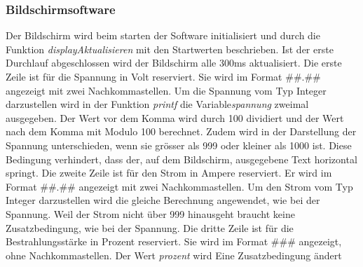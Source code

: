 \subsubsection{Bildschirmsoftware}
Der Bildschirm wird beim starten der Software initialisiert und durch die Funktion \textit{displayAktualisieren} mit den Startwerten beschrieben. Ist der erste Durchlauf abgeschlossen wird der Bildschirm alle 300ms aktualisiert.
\newline
Die erste Zeile ist für die Spannung in Volt reserviert. Sie wird im Format ##.## angezeigt mit zwei Nachkommastellen. Um die Spannung vom Typ Integer darzustellen wird in der Funktion \textit{printf} die Variable\textit{spannung} zweimal ausgegeben. Der Wert vor dem Komma wird durch 100 dividiert und der Wert nach dem Komma mit Modulo 100 berechnet. Zudem wird in der Darstellung der Spannung unterschieden, wenn sie grösser als 999 oder kleiner als 1000 ist. Diese Bedingung verhindert, dass der, auf dem Bildschirm, ausgegebene Text horizontal springt. 
\newline
Die zweite Zeile ist für den Strom in Ampere reserviert. Er wird im Format ##.## angezeigt mit zwei Nachkommastellen. Um den Strom vom Typ Integer darzustellen wird die gleiche Berechnung angewendet, wie bei der Spannung. Weil der Strom nicht über 999 hinausgeht braucht keine Zusatzbedingung, wie bei der Spannung.
\newline
Die dritte Zeile ist für die Bestrahlungsstärke in Prozent reserviert. Sie wird im Format ### angezeigt, ohne Nachkommastellen. Der Wert \textit{prozent} wird  Eine Zusatzbedingung ändert 